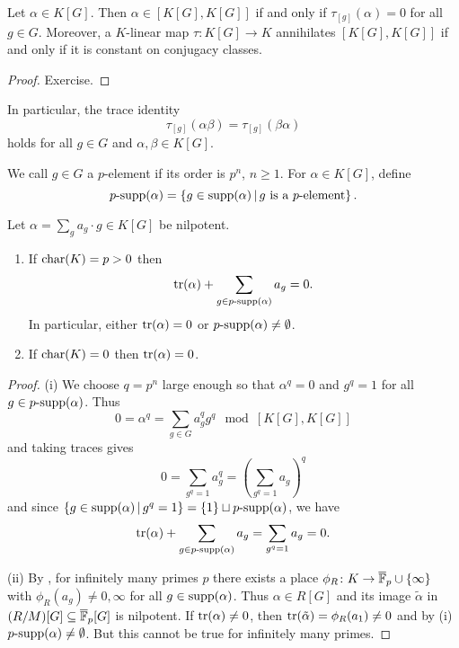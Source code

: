 \begin{lemma}
    \label{lemma:commutators_and_traces}
    Let $\alpha \in K[G]$.
    Then $\alpha \in [K[G], K[G]]$ if and only if $\tau_{[g]}(\alpha) = 0$ for all $g \in G$.
    Moreover, a $K$-linear map $\tau \colon K[G] \to K$ annihilates $[K[G], K[G]]$ if and only if it is constant on conjugacy classes.
\end{lemma}

\begin{proof}
    Exercise.
\end{proof}

In particular, the trace identity \[
    \tau_{[g]}(\alpha \beta) = \tau_{[g]}(\beta \alpha)
\] holds for all $g \in G$ and $\alpha, \beta \in K[G]$.

\begin{definition}
    We call $g \in G$ a $p$-element if its order is $p^n$, $n \geq 1$.
    For $\alpha \in K[G]$, define \[
        \text{$p$-supp}(\alpha) = \left\{ g \in \operatorname{supp}(\alpha) \,\middle|\, \text{$g$ is a $p$-element} \right\}.
    \]
\end{definition}

\begin{lemma}
    Let $\alpha = \sum_g a_g \cdot g \in K[G]$ be nilpotent.
    \begin{enumerate}
        \item[(i)] If $\mathrm{char}(K) = p > 0$ then \[
            \operatorname{tr}(\alpha) + \sum_{g \in \text{$p$-supp}(\alpha)} a_g = 0.
        \] In particular, either $\operatorname{tr}(\alpha) = 0$ or $\text{$p$-supp}(\alpha) \neq \emptyset$.
        \item[(ii)] If $\mathrm{char}(K) = 0$ then $\operatorname{tr}(\alpha) = 0$.
    \end{enumerate}
\end{lemma}

\begin{proof}
    (i) We choose $q = p^n$ large enough so that $\alpha^q = 0$ and $g^q = 1$ for all $g \in \text{$p$-supp}(\alpha)$.
    Thus \[
        0 = \alpha^q = \sum_{g \in G} a_g^q g^q \mod [K[G], K[G]]
    \] and taking traces gives \[
        0 = \sum_{g^q = 1} a_g^q = (\sum_{g^q = 1} a_g)^q
    \] and since $\left\{ g \in \operatorname{supp}(\alpha) \,\middle|\, g^q = 1 \right\} = \{1\} \sqcup \text{$p$-supp}(\alpha)$, we have \[
        \operatorname{tr}(\alpha) + \sum_{g \in \text{$p$-supp}(\alpha)} a_g = \sum_{g^q = 1}a_g = 0.
    \]

    (ii) By , for infinitely many primes $p$ there exists a place $\phi_R \colon K \to \overline{\mathbb{F}}_p \cup \{\infty\}$ with $\phi_R(a_g) \neq 0, \infty$ for all $g \in \operatorname{supp}(\alpha)$.
    Thus $\alpha \in R[G]$ and its image $\tilde{\alpha}$ in $(R / M)[G] \subseteq \overline{\mathbb{F}}_p[G]$ is nilpotent.
    If $\operatorname{tr}(\alpha) \neq 0$, then $\operatorname{tr}(\tilde{\alpha}) = \phi_R(a_1) \neq 0$ and by (i) $\text{$p$-supp}(\alpha) \neq \emptyset$.
    But this cannot be true for infinitely many primes.
\end{proof}


